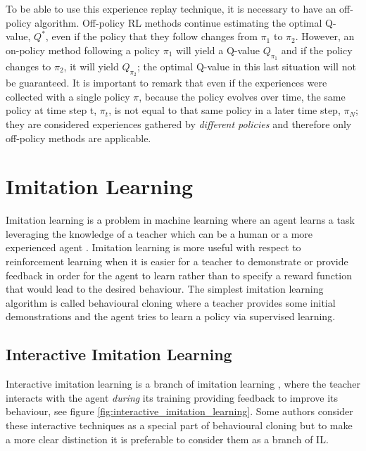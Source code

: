 

To be able to use this experience replay technique, it is necessary to have an off-policy algorithm. Off-policy RL methods continue estimating the optimal Q-value, $Q^*$, even if the policy that they follow changes from $\pi_1$ to $\pi_2$. However, an on-policy method following a policy $\pi_1$ will yield a Q-value $Q_{\pi_1}$ and if the policy changes to $\pi_2$, it will yield $Q_{\pi_2}$; the optimal Q-value in this last situation will not be guaranteed. It is important to remark that even if the experiences were collected with a single policy $\pi$, because the policy evolves over time, the same policy at time step t, $\pi_t$, is not equal to that same policy in a later time step, $\pi_N$; they are considered experiences gathered by \textit{different policies} and therefore only off-policy methods are applicable.













\section{Imitation Learning}
\label{section:Imitation-Learning}

Imitation learning is a problem in machine learning where an agent learns a task leveraging the knowledge of a teacher which can be a human or a more experienced agent \cite{Imitation-Learning-definition-torabi:2019}. Imitation learning is more useful with respect to reinforcement learning when it is easier for a teacher to demonstrate or provide feedback in order for the agent to learn rather than to specify a reward function that would lead to the desired behaviour. The simplest imitation learning algorithm is called behavioural cloning where a teacher provides some initial demonstrations and the agent tries to learn a policy via supervised learning.


\subsection{Interactive Imitation Learning}
\label{sec:Interactive-Imitation-Learning}

Interactive imitation learning is a branch of imitation learning \cite{lazydagger:2021}, where the teacher interacts with the agent \textit{during} its training providing feedback to improve its behaviour, see figure \ref{fig:interactive_imitation_learning}. Some authors \cite{Osa:2018} consider these interactive techniques as a special part of behavioural cloning but to make a more clear distinction it is preferable to consider them as a branch of IL.



